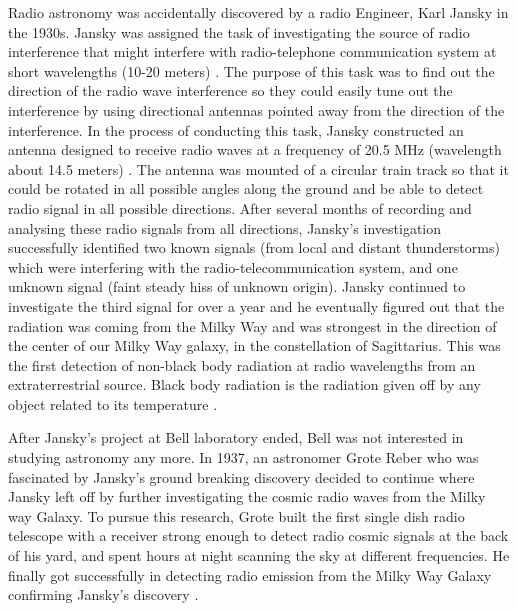 Radio astronomy was accidentally discovered by a radio Engineer, Karl Jansky in the 1930s.
Jansky was assigned the task of investigating the source of radio interference that might interfere with radio-telephone communication system at short wavelengths (10-20 meters) \citep{verschuur2015invisible}.
The purpose of this task was to find out the direction of the radio wave interference so they could easily tune out the interference by using directional antennas pointed away from the direction of the interference. In the process of conducting this task, Jansky constructed an antenna designed to receive radio waves at a frequency of 20.5 MHz (wavelength about 14.5 meters) \citep{Jansky0}. The antenna was mounted of a circular train track so that it could be rotated in all possible angles along the ground and be able to detect radio signal in all possible directions. After several months of recording and analysing these radio signals from all directions, Jansky's investigation  successfully identified two known signals (from local and  distant thunderstorms) which were interfering with the radio-telecommunication system, and one unknown signal (faint steady hiss of unknown origin). Jansky continued to investigate the third signal for over a year and he eventually figured out that the radiation was coming from the Milky Way and was strongest in the direction of the center of our Milky Way
galaxy, in the constellation of Sagittarius. This was the first detection of non-black body radiation at radio wavelengths from an extraterrestrial source. Black body radiation is the radiation given off by any object
related to its temperature \citep{Jansky1}.

After Jansky's project at Bell laboratory ended, Bell was not interested in studying astronomy any more. In 1937, an astronomer Grote Reber who was fascinated by Jansky's ground breaking discovery decided to continue where Jansky left off by further investigating the cosmic radio waves from the Milky way Galaxy. To pursue this research, Grote built the first single dish radio telescope with a receiver strong enough to detect radio cosmic signals at the back of his yard, and spent hours at night scanning the sky at different frequencies. He finally got successfully in detecting radio emission from the Milky Way Galaxy confirming Jansky's discovery \citep{verschuur2015invisible}.   

